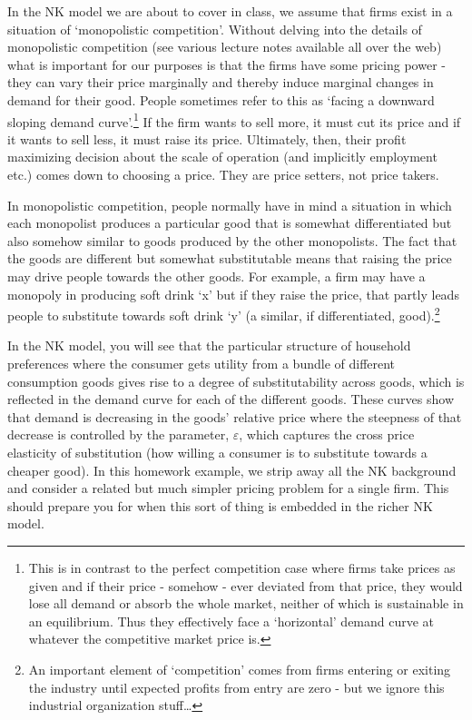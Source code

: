 \documentclass[authoryear,11pt]{elsarticle}
\begin{document}
In the NK model we are about to cover in class, we assume that firms exist in a situation of `monopolistic competition'. Without delving into the details of monopolistic competition (see various lecture notes available all over the web) what is important for our purposes is that the firms have some pricing power - they can vary their price marginally and thereby induce marginal changes in demand for their good. People sometimes refer to this as `facing a downward sloping demand curve'.\footnote{This is in contrast to the perfect competition case where firms take prices as given and if their price - somehow - ever deviated from that price, they would lose all demand or absorb the whole market, neither of which is sustainable in an equilibrium. Thus they effectively face a `horizontal' demand curve at whatever the competitive market price is.} If the firm wants to sell more, it must cut its price and if it wants to sell less, it must raise its price. Ultimately, then, their profit maximizing decision about the scale of operation (and implicitly employment etc.) comes down to choosing a price. They are price setters, not price takers.

In monopolistic competition, people normally have in mind a situation in which each monopolist produces a particular good that is somewhat differentiated but also somehow similar to goods produced by the other monopolists. The fact that the goods are different but somewhat substitutable means that raising the price may drive people towards the other goods. For example, a firm may have a monopoly in producing soft drink `x' but if they raise the price, that partly leads people to substitute towards soft drink `y' (a similar, if differentiated, good).\footnote{An important element of `competition' comes from firms entering or exiting the industry until expected profits from entry are zero - but we ignore this industrial organization stuff\ldots}

In the NK model, you will see that the particular structure of household preferences where the consumer gets utility from a bundle of different consumption goods gives rise to a degree of substitutability across goods, which is reflected in the demand curve for each of the different goods. These curves show that demand is decreasing in the goods' relative price where the steepness of that decrease is controlled by the parameter, $\varepsilon$, which captures the cross price elasticity of substitution (how willing a consumer is to substitute towards a cheaper good). In this homework example, we strip away all the NK background and consider a related but much simpler pricing problem for a single firm. This should prepare you for when this sort of thing is embedded in the richer NK model.
\end{document}
